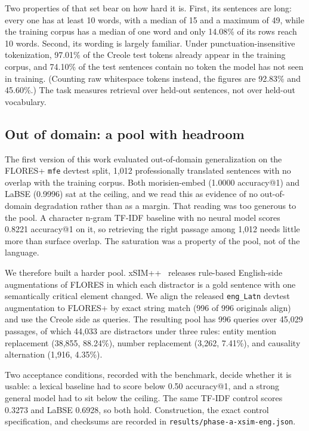 \documentclass[11pt]{article}
\begin{document}
Two properties of that set bear on how hard it is. First, its sentences are long: every one has at
least 10 words, with a median of 15 and a maximum of 49, while the training corpus has a median of
one word and only 14.08\% of its rows reach 10 words. Second, its wording is largely familiar. Under
punctuation-insensitive tokenization, 97.01\% of the Creole test tokens already appear in the
training corpus, and 74.10\% of the test sentences contain no token the model has not seen in
training. (Counting raw whitespace tokens instead, the figures are 92.83\% and 45.60\%.) The task
measures retrieval over held-out sentences, not over held-out vocabulary.

\subsection{Out of domain: a pool with headroom}
\label{sec:xsim}

The first version of this work evaluated out-of-domain generalization on the FLORES+ \texttt{mfe}
devtest split, 1{,}012 professionally translated sentences with no overlap with the training corpus.
Both morisien-embed (1.0000 accuracy@1) and LaBSE (0.9996) sat at the ceiling, and we read this as
evidence of no out-of-domain degradation rather than as a margin. That reading was too generous to
the pool. A character n-gram TF-IDF baseline with no neural model scores 0.8221 accuracy@1 on it, so
retrieving the right passage among 1{,}012 needs little more than surface overlap. The saturation was
a property of the pool, not of the language.

We therefore built a harder pool. xSIM++~\citep{chen2023xsimpp} releases rule-based English-side
augmentations of FLORES in which each distractor is a gold sentence with one semantically critical
element changed. We align the released \texttt{eng\_Latn} devtest augmentation to FLORES+ by exact
string match (996 of 996 originals align) and use the Creole side as queries. The resulting pool has
996 queries over 45{,}029 passages, of which 44{,}033 are distractors under three rules:
entity mention replacement (38{,}855, 88.24\%), number replacement (3{,}262, 7.41\%), and causality
alternation (1{,}916, 4.35\%).

Two acceptance conditions, recorded with the benchmark, decide whether it is usable: a lexical
baseline had to score below 0.50 accuracy@1, and a strong general model had to sit below the ceiling.
The same TF-IDF control scores 0.3273 and LaBSE 0.6928, so both hold. Construction, the exact control specification,
and checksums are recorded in \texttt{results/phase-a-xsim-eng.json}.
\end{document}
